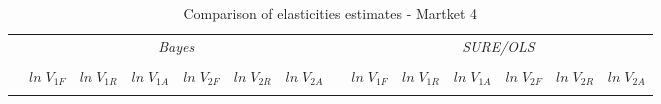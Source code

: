 \begin{table} [H]
\caption{Comparison of elasticities estimates - Martket 4}
\label{tbl:mkt4_weak_SCOTYORK}
\centering
\begin{tabular}{lrrrrrrrrrrrrr}
  \toprule 
 & \multicolumn{6}{c}{\textit{Bayes}} && \multicolumn{6}{c}{\textit{SURE/OLS}} \\ 
\cline{2-7} \cline{9-14} 
\\[-1.8ex] & $ln \; V_{1F}$ & $ln \; V_{1R}$ & $ln \; V_{1A}$ & $ln \; V_{2F}$ & $ln \; V_{2R}$ & $ln \; V_{2A}$ & & $ln \; V_{1F}$ & $ln \; V_{1R}$ & $ln \; V_{1A}$ & $ln \; V_{2F}$ & $ln \; V_{2R}$ & $ln \; V_{2A}$ \\ 
\hline \\[-1.8ex] 


\end{tabular}
\end{table}
